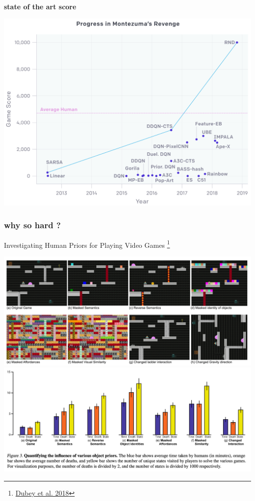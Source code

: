 \documentclass{beamer}
\begin{document}
  
  \begin{frame}{\bf state of the art score}
  
  \centering
  \includegraphics[scale=0.2]{../images/montezuma_progress.png}
  
  
\end{frame}



\begin{frame}
  
  \frametitle{why so hard ?} 

  {Investigating Human Priors for Playing Video Games \footnote{\href{https://arxiv.org/pdf/1802.10217.pdf}{Dubey et al. 2018}} }

  \centering
  \includegraphics[scale=0.25]{../papers_captions/human_priors_0.png}
  \includegraphics[scale=0.25]{../papers_captions/human_priors_1.png}
  
\end{frame}
\end{document}
